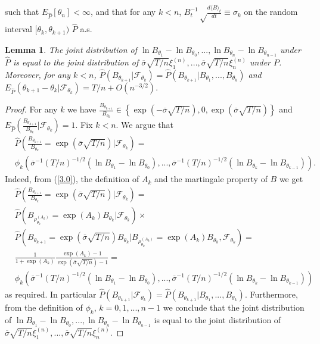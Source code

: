 \documentclass{amsart}
\newtheorem{lem}[thm]{Lemma}
\numberwithin{equation}{section}
\begin{document}
such that $E_{\hat P}[\theta_n]<\infty$, and that for any $k<n$,
$B^{-1}_t\sqrt\frac{d\langle B\rangle _t}{dt}\equiv \sigma_k$
on the random interval $[\theta_k,\theta_{k+1})$ $\hat P$ a.s.
\begin{lem}\label{lem3.2}
The joint distribution of
$\ln B_{\theta_1}- \ln B_{\theta_0},..., \ln B_{\theta_{n}}-\ln  B_{\theta_{n-1}}$ under $\hat P$ is equal to the
joint distribution of $\overline{\sigma}\sqrt {T/n}\xi^{(n)}_1,...,\overline{\sigma}\sqrt {T/n}\xi^{(n)}_{n}$
under $P$. Moreover, for any $k<n$,
$\hat P(B_{\theta_{k+1}}|\mathcal F_{\theta_k})=\hat P(B_{\theta_{k+1}}|B_{\theta_1},...,B_{\theta_k})$ and
$E_{\hat P}(\theta_{k+1}-\theta_{k}|\mathcal F_{\theta_k})=T/n+O(n^{-3/2}).$
\end{lem}
\begin{proof}
For any $k$ we have $\frac{B_{\theta_{k+1}}}{B_{\theta_k}}\in \left
\{\exp(-\overline{\sigma}\sqrt{T/n}),0,\exp(\overline{\sigma}\sqrt{T/n})
\right\}$ and $E_{\hat P}\left(\frac{B_{\theta_{k+1}}}{B_{\theta_k}}|\mathcal F_{\theta_k}\right)=1$.
Fix $k<n$. We argue
that
\begin{eqnarray}\label{3.yan}
&\hat P\left(\frac{B_{\theta_{k+1}}}{B_{\theta_k}}=\exp(\overline{\sigma}\sqrt{T/n})|\mathcal F_{\theta_k}\right)=\\
&\phi_{k}\left(\overline{\sigma}^{-1}(T/n)^{-1/2}(\ln B_{\theta_1}- \ln B_{\theta_0}),..., \overline{\sigma}^{-1}(T/n)^{-1/2}(\ln B_{\theta_{k}}-\ln  B_{\theta_{k-1}})\right).\nonumber
\end{eqnarray}
Indeed, from (\ref{3.0}), the definition of $A_k$ and the
martingale property of $B$ we get
\begin{eqnarray*}
&\hat P\left(\frac{B_{\theta_{k+1}}}{B_{\theta_k}}=\exp(\overline{\sigma}\sqrt{T/n})|\mathcal F_{\theta_k}\right)=\\
&\hat P\left(B_{\rho^{(A_k)}_{\theta_k}}=\exp(A_k) B_{\theta_k}|\mathcal F_{\theta_k}\right)\times\\
&\hat P\left(B_{\theta_{k+1}}=\exp(\overline{\sigma}\sqrt{T/n})B_{\theta_{k}}|B_{\rho^{(A_k)}_{\theta_k}}=\exp(A_k) B_{\theta_k},\mathcal F_{\theta_k}\right)=\\
&\frac{1}{1+\exp(A_k)}\frac{\exp(A_k)-1}{\exp(\overline\sigma\sqrt{T/n})-1}=\\
&\phi_{k}\left(\overline{\sigma}^{-1}(T/n)^{-1/2}(\ln B_{\theta_1}- \ln B_{\theta_0}),..., \overline{\sigma}^{-1}(T/n)^{-1/2}(\ln B_{\theta_{k}}-\ln  B_{\theta_{k-1}})\right)
\end{eqnarray*}
as required. In particular
$\hat P(B_{\theta_{k+1}}|\mathcal F_{\theta_k})=\hat P(B_{\theta_{k+1}}|B_{\theta_1},...,B_{\theta_k})$. Furthermore, from the definition of
$\phi_k$, $k=0,1,...,n-1$ we conclude that the joint distribution of
$\ln B_{\theta_1}- \ln B_{\theta_0},..., \ln B_{\theta_{n}}-\ln  B_{\theta_{n-1}}$ is equal to the
joint distribution of $\overline{\sigma}\sqrt {T/n}\xi^{(n)}_1,...,\overline{\sigma}\sqrt {T/n}\xi^{(n)}_{n}$.


\end{proof}
\end{document}

